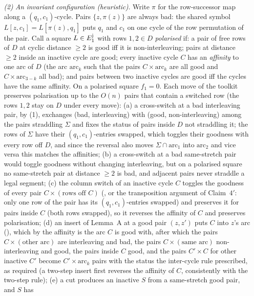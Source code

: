 \emph{(2) An invariant configuration (heuristic).}  Write $\pi$ for
the row-successor map along a $(q_1,c_1)$-cycle.  Pairs $\{z,\pi(z)\}$
are always bad: the shared symbol $L[z,c_1]=L[\pi(z),q_1]$ puts $q_1$
and $c_1$ on one cycle of the row permutation of the pair.  Call a
square $L\in E_1^{\rm j}$ with rows $1,2\in D$ \emph{polarised} if:
a pair of free rows of $D$ at cyclic distance $\ge2$ is good iff it is
non-interleaving; pairs at distance $\ge2$ inside an inactive cycle
are good; every inactive cycle $C$ has an \emph{affinity} to one arc
of $D$ (the arc $\text{arc}_k$ such that the pairs $C\times\text{arc}_k$
are all good and $C\times\text{arc}_{3-k}$ all bad); and pairs between
two inactive cycles are good iff the cycles have the same affinity.
On a polarised square $f_1=0$.  Each move of the toolkit preserves
polarisation up to the $O(n)$ pairs that contain a switched row (the
rows $1,2$ stay on $D$ under every move): (a) a cross-switch at a bad
interleaving pair, by (1), exchanges (bad, interleaving) with (good,
non-interleaving) among the pairs straddling $\Sigma$ and fixes the
status of pairs inside $D$ not straddling it; the rows of $\Sigma$ have
their $(q_1,c_1)$-entries swapped, which toggles their goodness with
every row off $D$, and since the reversal also moves
$\Sigma\cap\text{arc}_1$ into $\text{arc}_2$ and vice versa this
matches the affinities; (b) a cross-switch at a bad same-stretch pair
would toggle goodness without changing interleaving, but on a
polarised square no same-stretch pair at distance $\ge2$ is bad, and
adjacent pairs never straddle a legal segment; (c) the column switch
of an inactive cycle $C$ toggles the goodness of every pair
$C\times(\text{rows off }C)$ (\cite[Lemma~2.3(1)--(2)]{AM26}, or the
transposition argument of Claim~$4'$: only one row of the pair has its
$(q_1,c_1)$-entries swapped) and preserves it for pairs inside $C$
(both rows swapped), so it reverses the affinity of $C$ and preserves
polarisation; (d) an insert of Lemma~A at a good pair $(z,z')$ puts
$C$ into $z$'s arc (\cite[Lemma~2.4(2)]{AM26}), which by the
affinity is the arc $C$ is good with, after which the pairs
$C\times(\text{other arc})$ are interleaving and bad, the pairs
$C\times(\text{same arc})$ non-interleaving and good, the pairs
inside $C$ good, and the pairs $C'\times C$ for other inactive $C'$
become $C'\times\text{arc}_k$ pairs with the status the inter-cycle
rule prescribed, as required (a two-step insert first reverses the
affinity of $C$, consistently with the two-step rule); (e) a cut
produces an inactive $S$ from a same-stretch good pair, and $S$ has
